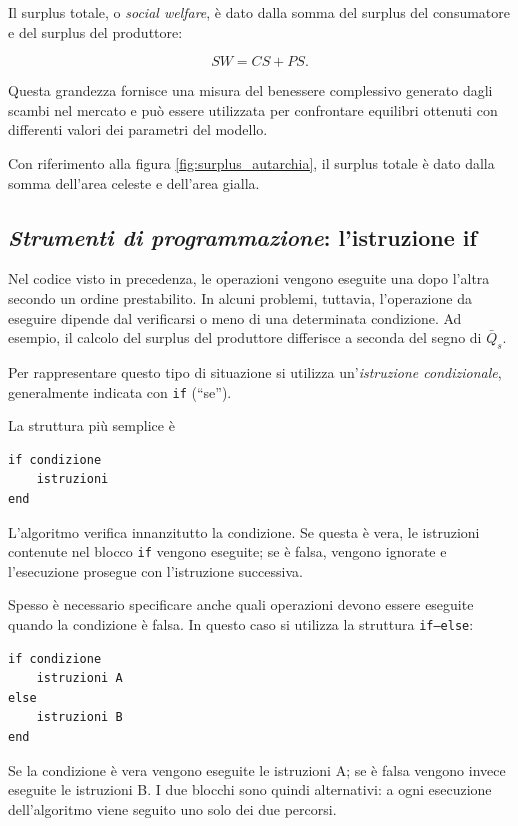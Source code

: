 Il surplus totale, o \emph{social welfare}, è dato dalla somma
del surplus del consumatore e del surplus del produttore:

\begin{equation*}
SW=CS+PS.
\end{equation*}

Questa grandezza fornisce una misura del benessere complessivo
generato dagli scambi nel mercato e può essere utilizzata per
confrontare equilibri ottenuti con differenti valori dei
parametri del modello.

Con riferimento alla figura \ref{fig:surplus_autarchia}, il surplus totale è dato dalla somma dell'area celeste e dell'area gialla.


\subsection{\textbf{\textit{Strumenti di programmazione}}: l'istruzione if}

Nel codice visto in precedenza, le operazioni vengono eseguite
una dopo l'altra secondo un ordine prestabilito. In alcuni problemi,
tuttavia, l'operazione da eseguire dipende dal verificarsi o meno di
una determinata condizione. Ad esempio, il calcolo del surplus del produttore differisce a seconda del segno di $\bar Q_s$.

Per rappresentare questo tipo di situazione si utilizza
un'\emph{istruzione condizionale}, generalmente indicata con
\texttt{if} (``se'').

La struttura più semplice è

\begin{verbatim}
if condizione
    istruzioni
end
\end{verbatim}

L'algoritmo verifica innanzitutto la condizione. Se questa è vera,
le istruzioni contenute nel blocco \texttt{if} vengono eseguite;
se è falsa, vengono ignorate e l'esecuzione prosegue con
l'istruzione successiva.

Spesso è necessario specificare anche quali operazioni devono essere
eseguite quando la condizione è falsa. In questo caso si utilizza
la struttura \texttt{if--else}:

\begin{verbatim}
if condizione
    istruzioni A
else
    istruzioni B
end
\end{verbatim}

Se la condizione è vera vengono eseguite le istruzioni A; se è falsa
vengono invece eseguite le istruzioni B. I due blocchi sono quindi
alternativi: a ogni esecuzione dell'algoritmo viene seguito uno solo
dei due percorsi.

